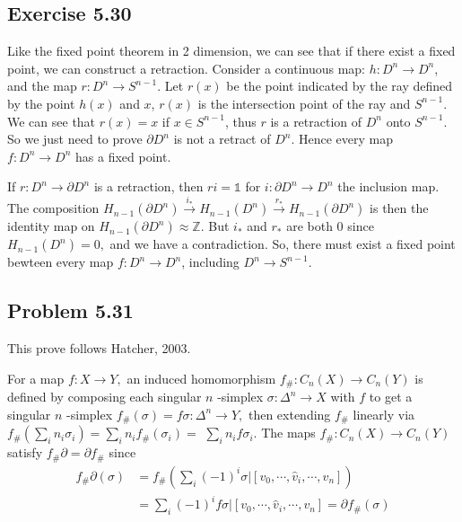 \documentclass[]{ctexart}
\begin{document}
	\subsection{Exercise 5.30}
		Like the fixed point theorem in 2 dimension, we can see that if there exist a fixed point, we can construct a retraction. Consider a continuous map: $h:D^n\to D^n$, and the map $r: D^{n}\to S^{n-1}$. Let $r(x)$ be the point indicated by the ray defined by the point $h(x)$ and $x$, $r(x)$ is the intersection point of the ray and $S^{n-1}$. We can see that $r(x)=x$ if $x\in S^{n-1}$, thus $r$ is a retraction of $D^n$ onto $S^{n-1}$. So we just need to prove $\partial D^{n}$ is not a retract of $D^{n} .$ Hence every map $f: D^{n} \rightarrow D^{n}$ has a fixed point.
		
		If $r: D^{n} \rightarrow \partial D^{n}$ is a retraction, then $r i=\mathds{1}$ for $i: \partial D^{n} \rightarrow D^{n}$ the inclusion map. The composition $H_{n-1}\left(\partial D^{n}\right) \stackrel{i_{*}}{\longrightarrow}H_{n-1}\left(D^{n}\right) \stackrel{r_{*}}{\longrightarrow} H_{n-1}\left(\partial D^{n}\right)$ is then the identity map on $H_{n-1}\left(\partial D^{n}\right) \approx \mathbb{Z} .$ But $i_{*}$ and $r_{*}$ are both 0 since $H_{n-1}\left(D^{n}\right)=0,$ and we have a contradiction. So, there must exist a fixed point bewteen every map $f:D^n\to D^n$, including $D^n\to S^{n-1}$. 
		
	\subsection{Problem 5.31}
		This prove follows Hatcher, 2003. 
		
		For a map $f: X \rightarrow Y,$ an induced homomorphism $f_{\#}: C_{n}(X) \rightarrow C_{n}(Y)$ is defined by composing each singular $n$ -simplex $\sigma: \Delta^{n} \rightarrow X$ with $f$ to get a singular $n$ -simplex $f_{\#}(\sigma)=f \sigma: \Delta^{n} \rightarrow Y,$ then extending $f_{\#}$ linearly via $f_{\#}\left(\sum_{i} n_{i} \sigma_{i}\right)=\sum_{i} n_{i} f_{\#}\left(\sigma_{i}\right)=$
		$\sum_{i} n_{i} f \sigma_{i} .$ The maps $f_{\#}: C_{n}(X) \rightarrow C_{n}(Y)$ satisfy $f_{\#} \partial=\partial f_{\#}$ since
			\begin{equation*}
			\begin{aligned}
				f_{\#} \partial(\sigma) &=f_{\#}\left(\sum_{i}(-1)^{i} \sigma |\left[v_{0}, \cdots, \hat{v}_{i}, \cdots, v_{n}\right]\right) \\
				&=\sum_{i}(-1)^{i} f \sigma |\left[v_{0}, \cdots, \hat{v}_{i}, \cdots, v_{n}\right]=\partial f_{\#}(\sigma)
			\end{aligned}
			\end{equation*}
			
\end{document}
